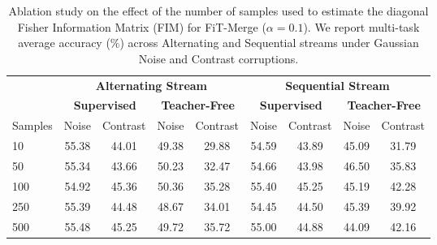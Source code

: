 \begin{table}[t]
\caption{Ablation study on the effect of the number of samples used to estimate the diagonal Fisher Information Matrix (FIM) for FiT-Merge ($\alpha = 0.1$). We report multi-task average accuracy (\%) across Alternating and Sequential streams under Gaussian Noise and Contrast corruptions.}
\label{tab:ablation_samples}
\vskip 0.05in
\begin{center}
\begin{scriptsize}
\begin{sc}
\begin{tabular}{lcccccccc}
\toprule
& \multicolumn{4}{c}{\textbf{Alternating Stream}} & \multicolumn{4}{c}{\textbf{Sequential Stream}} \\
\cmidrule(r){2-5} \cmidrule(l){6-9}
& \multicolumn{2}{c}{\textbf{Supervised}} & \multicolumn{2}{c}{\textbf{Teacher-Free}} & \multicolumn{2}{c}{\textbf{Supervised}} & \multicolumn{2}{c}{\textbf{Teacher-Free}} \\
\cmidrule(r){2-3} \cmidrule(l){4-5} \cmidrule(r){6-7} \cmidrule(l){8-9}
Samples & Noise & Contrast & Noise & Contrast & Noise & Contrast & Noise & Contrast \\
\midrule
10      & 55.38 & 44.01 & 49.38 & 29.88 & 54.59 & 43.89 & 45.09 & 31.79 \\
50      & 55.34 & 43.66 & 50.23 & 32.47 & 54.66 & 43.98 & 46.50 & 35.83 \\
100     & 54.92 & 45.36 & 50.36 & 35.28 & 55.40 & 45.25 & 45.19 & 42.28 \\
250     & 55.39 & 44.48 & 48.67 & 34.01 & 54.45 & 44.50 & 45.39 & 39.92 \\
500     & 55.48 & 45.25 & 49.72 & 35.72 & 55.00 & 44.88 & 44.09 & 42.16 \\
\bottomrule
\end{tabular}
\end{sc}
\end{scriptsize}
\end{center}
\vskip -0.15in
\end{table}
